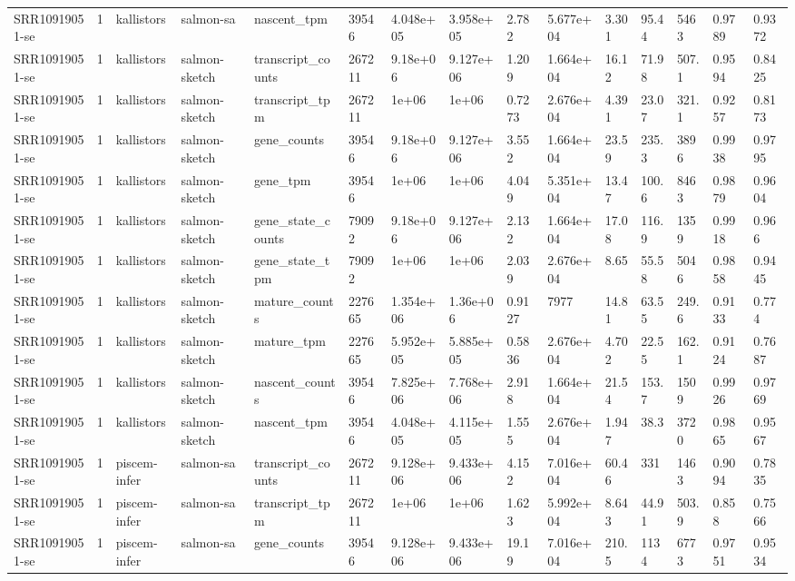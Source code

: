 \begin{tabular}{lllllllllllllll}
SRR10919051-se & 1 & kallistors & salmon-sa & nascent\_tpm & 39546 & 4.048e+05 & 3.958e+05 & 2.782 & 5.677e+04 & 3.301 & 95.44 & 5463 & 0.9789 & 0.9372 \\
SRR10919051-se & 1 & kallistors & salmon-sketch & transcript\_counts & 267211 & 9.18e+06 & 9.127e+06 & 1.209 & 1.664e+04 & 16.12 & 71.98 & 507.1 & 0.9594 & 0.8425 \\
SRR10919051-se & 1 & kallistors & salmon-sketch & transcript\_tpm & 267211 & 1e+06 & 1e+06 & 0.7273 & 2.676e+04 & 4.391 & 23.07 & 321.1 & 0.9257 & 0.8173 \\
SRR10919051-se & 1 & kallistors & salmon-sketch & gene\_counts & 39546 & 9.18e+06 & 9.127e+06 & 3.552 & 1.664e+04 & 23.59 & 235.3 & 3896 & 0.9938 & 0.9795 \\
SRR10919051-se & 1 & kallistors & salmon-sketch & gene\_tpm & 39546 & 1e+06 & 1e+06 & 4.049 & 5.351e+04 & 13.47 & 100.6 & 8463 & 0.9879 & 0.9604 \\
SRR10919051-se & 1 & kallistors & salmon-sketch & gene\_state\_counts & 79092 & 9.18e+06 & 9.127e+06 & 2.132 & 1.664e+04 & 17.08 & 116.9 & 1359 & 0.9918 & 0.966 \\
SRR10919051-se & 1 & kallistors & salmon-sketch & gene\_state\_tpm & 79092 & 1e+06 & 1e+06 & 2.039 & 2.676e+04 & 8.65 & 55.58 & 5046 & 0.9858 & 0.9445 \\
SRR10919051-se & 1 & kallistors & salmon-sketch & mature\_counts & 227665 & 1.354e+06 & 1.36e+06 & 0.9127 & 7977 & 14.81 & 63.55 & 249.6 & 0.9133 & 0.774 \\
SRR10919051-se & 1 & kallistors & salmon-sketch & mature\_tpm & 227665 & 5.952e+05 & 5.885e+05 & 0.5836 & 2.676e+04 & 4.702 & 22.55 & 162.1 & 0.9124 & 0.7687 \\
SRR10919051-se & 1 & kallistors & salmon-sketch & nascent\_counts & 39546 & 7.825e+06 & 7.768e+06 & 2.918 & 1.664e+04 & 21.54 & 153.7 & 1509 & 0.9926 & 0.9769 \\
SRR10919051-se & 1 & kallistors & salmon-sketch & nascent\_tpm & 39546 & 4.048e+05 & 4.115e+05 & 1.555 & 2.676e+04 & 1.947 & 38.3 & 3720 & 0.9865 & 0.9567 \\
SRR10919051-se & 1 & piscem-infer & salmon-sa & transcript\_counts & 267211 & 9.128e+06 & 9.433e+06 & 4.152 & 7.016e+04 & 60.46 & 331 & 1463 & 0.9094 & 0.7835 \\
SRR10919051-se & 1 & piscem-infer & salmon-sa & transcript\_tpm & 267211 & 1e+06 & 1e+06 & 1.623 & 5.992e+04 & 8.643 & 44.91 & 503.9 & 0.858 & 0.7566 \\
SRR10919051-se & 1 & piscem-infer & salmon-sa & gene\_counts & 39546 & 9.128e+06 & 9.433e+06 & 19.19 & 7.016e+04 & 210.5 & 1134 & 6773 & 0.9751 & 0.9534 \\

\end{tabular}
